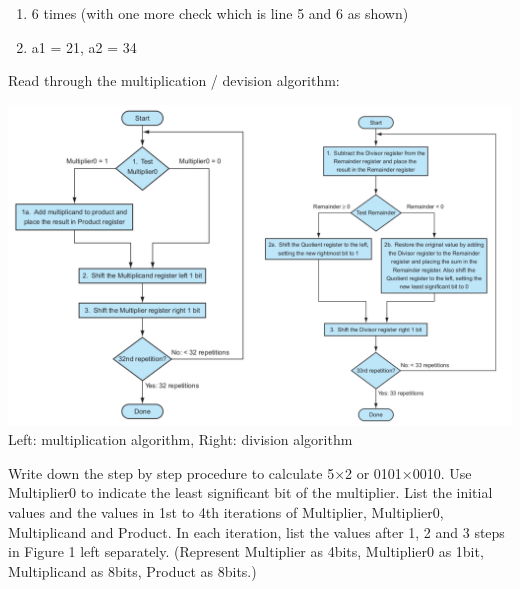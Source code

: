 \documentclass[12pt, a4paper]{article}
\begin{document}
\begin{ans}
    \begin{enumerate}
        \item 6 times (with one more check which is line 5 and 6 as shown)
        \item a1 = 21, a2 = 34
    \end{enumerate}
\end{ans}
\pagebreak
\begin{q}{20}
Read through the multiplication / devision algorithm: 
\begin{center}
    \includegraphics[scale=0.36]{q2.png}
    Left: multiplication algorithm, Right: division algorithm
\end{center}
Write down the step by step procedure to calculate 5×2 or 0101×0010. Use Multiplier0
to indicate the least significant bit of the multiplier. List the initial values and the values
in 1st to 4th iterations of Multiplier, Multiplier0, Multiplicand and Product. In each
iteration, list the values after 1, 2 and 3 steps in Figure 1 left separately. (Represent
Multiplier as 4bits, Multiplier0 as 1bit, Multiplicand as 8bits, Product as 8bits.)
\end{q}
\end{document}
